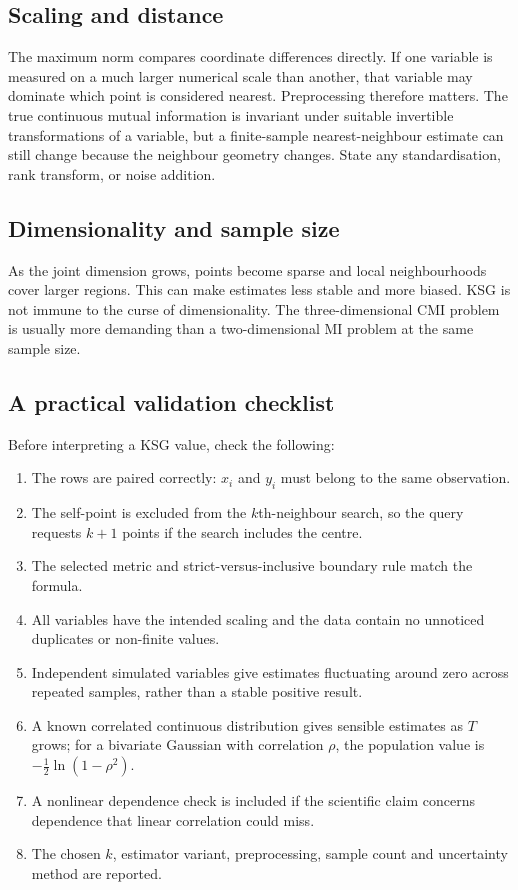 \documentclass[11pt,letterpaper,oneside]{report}
\begin{document}
\subsection{Scaling and distance}

The maximum norm compares coordinate differences directly. If one variable is measured on a much larger numerical scale than another, that variable may dominate which point is considered nearest. Preprocessing therefore matters. The true continuous mutual information is invariant under suitable invertible transformations of a variable, but a finite-sample nearest-neighbour estimate can still change because the neighbour geometry changes. State any standardisation, rank transform, or noise addition.

\subsection{Dimensionality and sample size}

As the joint dimension grows, points become sparse and local neighbourhoods cover larger regions. This can make estimates less stable and more biased. KSG is not immune to the curse of dimensionality. The three-dimensional CMI problem is usually more demanding than a two-dimensional MI problem at the same sample size.

\subsection{A practical validation checklist}

Before interpreting a KSG value, check the following:
\begin{enumerate}[label=\textbf{Check \arabic*.}]
\item The rows are paired correctly: $x_i$ and $y_i$ must belong to the same observation.
\item The self-point is excluded from the $k$th-neighbour search, so the query requests $k+1$ points if the search includes the centre.
\item The selected metric and strict-versus-inclusive boundary rule match the formula.
\item All variables have the intended scaling and the data contain no unnoticed duplicates or non-finite values.
\item Independent simulated variables give estimates fluctuating around zero across repeated samples, rather than a stable positive result.
\item A known correlated continuous distribution gives sensible estimates as $T$ grows; for a bivariate Gaussian with correlation $\rho$, the population value is $-\frac{1}{2}\ln(1-\rho^2)$.
\item A nonlinear dependence check is included if the scientific claim concerns dependence that linear correlation could miss.
\item The chosen $k$, estimator variant, preprocessing, sample count and uncertainty method are reported.
\end{enumerate}
\end{document}
